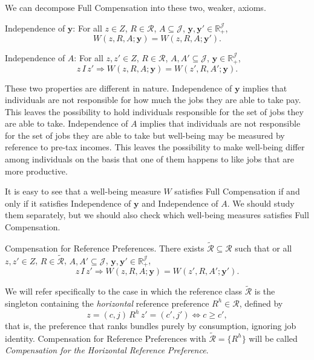 \documentclass[12pt,thmsb]{article}
\begin{document}
We can decompose Full Compensation into these two, weaker, axioms.

Independence of $\mathbf{y}$: For all $z\in Z$, $R\in \mathcal{R}$, $A\subseteq \mathcal{J}$, $\mathbf{y}, \mathbf{y}' \in \mathbb{R}_{+}^{\mathcal{J}}$, 
\begin{equation*}
\label{ }
W(z,R,A;\mathbf{y})=W(z,R,A;\mathbf{y}').
\end{equation*}

Independence of $A$: For all $z,z'\in Z$, $R\in \mathcal{R}$, $A,A'\subseteq \mathcal{J}$, $\mathbf{y}\in \mathbb{R}_{+}^{\mathcal{J}}$, 
\begin{equation*}
\label{ }
z\,I\,z'\Rightarrow W(z,R,A;\mathbf{y})=W(z',R,A';\mathbf{y}).
\end{equation*}

These two properties are different in nature. Independence of $\mathbf{y}$ implies that individuals are not responsible for how much the jobs they are able to take pay. This leaves the possibility to hold individuals responsible for the set of jobs they are able to take. Independence of $A$ implies that individuals are not responsible for the set of jobs they are able to take but well-being may be measured by reference to pre-tax incomes. This leaves the possibility to make well-being differ among individuals on the basis that one of them happens to like jobs that are more productive.

It is easy to see that a well-being measure $W$ satisfies Full Compensation if and only if it satisfies Independence of $\mathbf{y}$ and Independence of $A$. We should study them separately, but we should also check which well-being measures satisfies Full Compensation.

Compensation for Reference Preferences. There exists $\tilde{\mathcal{R}}\subseteq\mathcal{R}$ such that or all $z,z'\in Z$, $R\in \tilde{\mathcal{R}}$, $A,A'\subseteq \mathcal{J}$, $\mathbf{y}, \mathbf{y}' \in \mathbb{R}_{+}^{\mathcal{J}}$, 
\begin{equation*}
\label{ }
z\,I\,z'\Rightarrow W(z,R,A;\mathbf{y})=W(z',R,A';\mathbf{y}').
\end{equation*}

We will refer specifically to the case in which the reference class $\tilde{\mathcal R}$ is the singleton containing the \emph{horizontal} reference preference $R^h\in\mathcal R$, defined by
\begin{equation*}
z=(c,j)\,R^h\,z'=(c',j')\Leftrightarrow c\geq c',
\end{equation*}
that is, the preference that ranks bundles purely by consumption, ignoring job identity. Compensation for Reference Preferences with $\tilde{\mathcal R}=\{R^h\}$ will be called \emph{Compensation for the Horizontal Reference Preference}.
\end{document}
